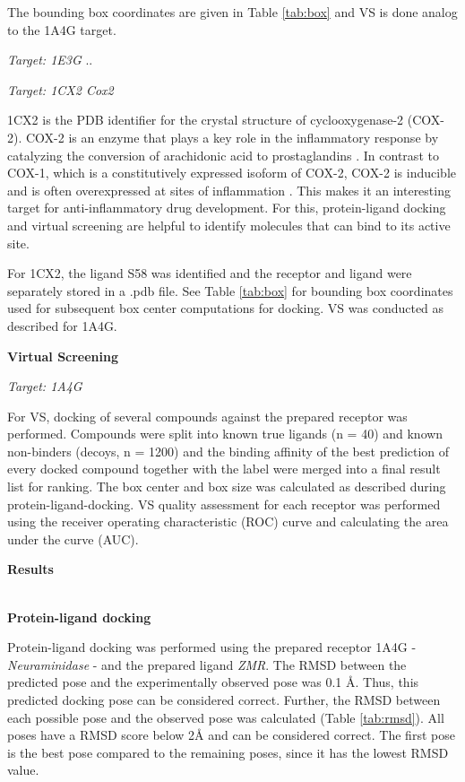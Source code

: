 \documentclass[a4paper,10pt]{article}
\begin{document}
The bounding box coordinates are given in Table \ref{tab:box} and VS is done analog to the 1A4G target.

\textit{Target: 1E3G}
..


\textit{Target: 1CX2 Cox2}

1CX2 is the PDB identifier for the crystal structure of cyclooxygenase-2 (COX-2). COX-2 is an enzyme that plays a key role in the inflammatory response by catalyzing the conversion of arachidonic acid to prostaglandins \cite{1CX2}. In contrast to COX-1, which is a constitutively expressed isoform of COX-2, COX-2 is inducible and is often overexpressed at sites of inflammation \cite{1CX2_2}. This makes it an interesting target for anti-inflammatory drug development. For this, protein-ligand docking and virtual screening are helpful to identify molecules that can bind to its active site. 

For 1CX2, the ligand S58 was identified and the receptor and ligand were separately stored in a .pdb file. See Table \ref{tab:box} for bounding box coordinates used for subsequent box center computations for docking. VS was conducted as described for 1A4G.





\textbf{Virtual Screening}

\textit{Target: 1A4G}

For VS, docking of several compounds against the prepared receptor was performed. Compounds were split into known true ligands (n = 40) and known non-binders (decoys, n = 1200) and the binding affinity of the best prediction of every docked compound together with the label were merged into a final result list for ranking. The box center and box size was calculated as described during protein-ligand-docking.
VS quality assessment for each receptor was performed using the receiver operating characteristic (ROC) curve and calculating the area under the curve (AUC).


\begin{large}
	\vspace{0.5cm}
	\textbf{Results}
\end{large}	\\ [1mm]

\textbf{Protein-ligand docking}

Protein-ligand docking was performed using the prepared receptor 1A4G - \textit{Neuraminidase} - and the prepared ligand \textit{ZMR}. The RMSD between the predicted pose and the experimentally observed pose was 0.1 Å. Thus, this predicted docking pose can be considered correct. Further, the RMSD between each possible pose and the observed pose was calculated (Table \ref{tab:rmsd}). All poses have a RMSD score below 2Å and can be considered correct. The first pose is the best pose compared to the remaining poses, since it has the lowest RMSD value.
\end{document}
